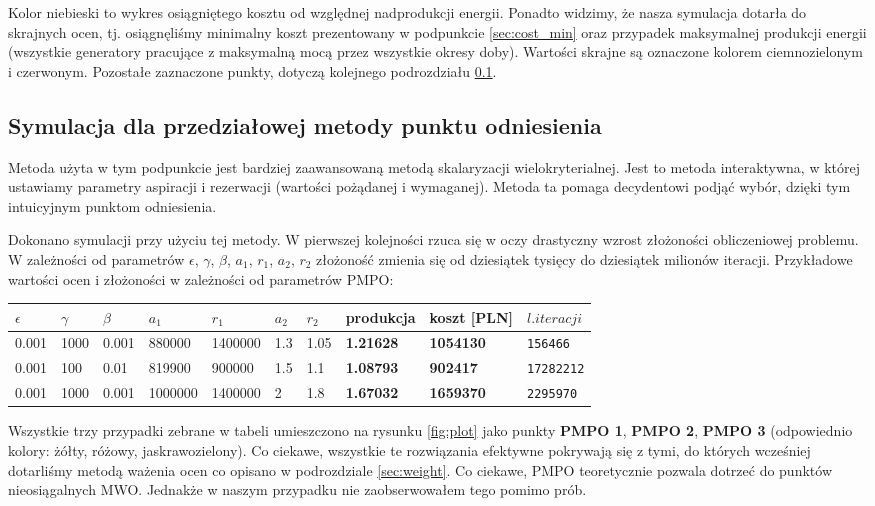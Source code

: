 \documentclass[12pt, twoside, hidelinks, a4paper]{article}
\begin{document}
Kolor niebieski to wykres osiągniętego kosztu od względnej nadprodukcji energii. Ponadto widzimy, że nasza symulacja dotarła do skrajnych ocen, tj. osiągnęliśmy minimalny koszt prezentowany w podpunkcie \ref{sec:cost_min} oraz przypadek maksymalnej produkcji energii (wszystkie generatory pracujące z maksymalną mocą przez wszystkie okresy doby). Wartości skrajne są oznaczone kolorem ciemnozielonym i czerwonym. Pozostałe zaznaczone punkty, dotyczą kolejnego podrozdziału \ref{sec:pmpo}.

\subsection{Symulacja dla przedziałowej metody punktu odniesienia} \label{sec:pmpo}
Metoda użyta w tym podpunkcie jest bardziej zaawansowaną metodą skalaryzacji wielokryterialnej. Jest to metoda interaktywna, w której ustawiamy parametry aspiracji i rezerwacji (wartości pożądanej i wymaganej). Metoda ta pomaga decydentowi podjąć wybór, dzięki tym intuicyjnym punktom odniesienia.

Dokonano symulacji przy użyciu tej metody. W pierwszej kolejności rzuca się w oczy drastyczny wzrost złożoności obliczeniowej problemu. W zależności od parametrów $\epsilon$, $\gamma$, $\beta$, $a_1$, $r_1$, $a_2$, $r_2$ złożoność zmienia się od dziesiątek tysięcy do dziesiątek milionów iteracji. Przykładowe wartości ocen i złożoności w zależności od parametrów PMPO:

\begin{table}[H]
\begin{tabular}{llllllllll}
$\epsilon$ & $\gamma$ & $\beta$ & $a_1$ & $r_1$ & $a_2$ & $r_2$ & \textbf{produkcja} & \textbf{koszt [PLN]} & $l. iteracji$ \\ \hline
0.001                            & 1000                           & 0.001                         & 880000        & 1400000       & 1.3           & 1.05          & \textbf{1.21628}            & \textbf{1054130}        & \texttt{156466}               \\
0.001                            & 100                            & 0.01                          & 819900        & 900000        & 1.5           & 1.1           & \textbf{1.08793}            & \textbf{902417}         & \texttt{17282212}             \\
0.001                            & 1000                           & 0.001                         & 1000000       & 1400000       & 2             & 1.8           & \textbf{1.67032}            & \textbf{1659370}        & \texttt{2295970}             
\end{tabular}
\end{table}

Wszystkie trzy przypadki zebrane w tabeli umieszczono na rysunku \ref{fig:plot} jako punkty \textbf{PMPO 1}, \textbf{PMPO 2}, \textbf{PMPO 3} (odpowiednio kolory: żółty, różowy, jaskrawozielony). Co ciekawe, wszystkie te rozwiązania efektywne pokrywają się z tymi, do których wcześniej dotarliśmy metodą ważenia ocen co opisano w podrozdziale \ref{sec:weight}. Co ciekawe, PMPO teoretycznie pozwala dotrzeć do punktów nieosiągalnych MWO. Jednakże w naszym przypadku nie zaobserwowałem tego pomimo prób.

\end{document}
